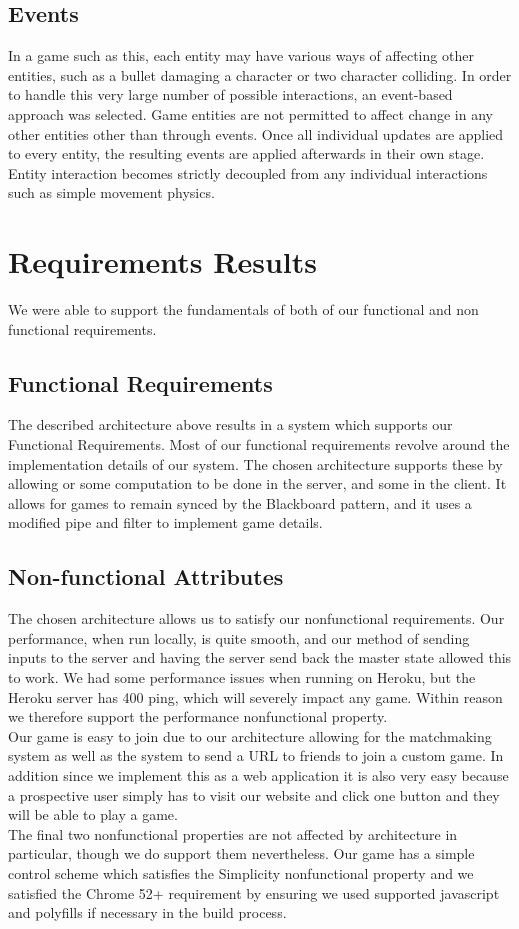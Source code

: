 \documentclass[12pt]{report}
\begin{document}
\subsection{Events}
In a game such as this, each entity may have various ways of affecting other
entities, such as a bullet damaging a character or two character colliding.  In
order to handle this very large number of possible interactions, an event-based
approach was selected.  Game entities are not permitted to affect change in any
other entities other than through events.  Once all individual updates are
applied to every entity, the resulting events are applied afterwards in their
own stage.  Entity interaction becomes strictly decoupled from any individual
interactions such as simple movement physics.

\section{Requirements Results}
We were able to support the fundamentals of both of our functional and non functional requirements. 
\subsection{Functional Requirements}
The described architecture above results in a system which supports our Functional Requirements. Most of our functional requirements revolve around the implementation details of our system. The chosen architecture supports these by allowing or some computation to be done in the server, and some in the client. It allows for games to remain synced by the Blackboard pattern, and it uses a modified pipe and filter to implement game details.  
\subsection{Non-functional Attributes}
The chosen architecture allows us to satisfy our nonfunctional requirements. Our performance, when run locally, is quite smooth, and our method of sending inputs to the server and having the server send back the master state allowed this to work. We had some performance issues when running on Heroku, but the Heroku server has 400 ping, which will severely impact any game. Within reason we therefore support the performance nonfunctional property. \\
Our game is easy to join due to our architecture allowing for the matchmaking system as well as the system to send a URL to friends to join a custom game. In addition since we implement this as a web application it is also very easy because a prospective user simply has to visit our website and click one button and they will be able to play a game. \\
The final two nonfunctional properties are not affected by architecture in particular, though we do support them nevertheless. Our game has a simple control scheme which satisfies the Simplicity nonfunctional property and we satisfied the Chrome 52+ requirement by ensuring we used supported javascript and polyfills if necessary in the build process.
\end{document}
